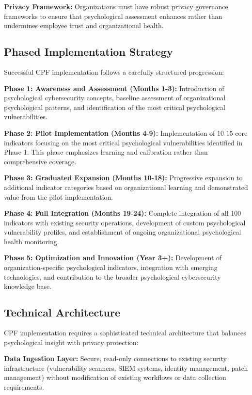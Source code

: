 \documentclass[10pt, twocolumn]{article}
\begin{document}
\textbf{Privacy Framework:} Organizations must have robust privacy governance frameworks to ensure that psychological assessment enhances rather than undermines employee trust and organizational health.

\subsection{Phased Implementation Strategy}

Successful CPF implementation follows a carefully structured progression:

\textbf{Phase 1: Awareness and Assessment (Months 1-3):} Introduction of psychological cybersecurity concepts, baseline assessment of organizational psychological patterns, and identification of the most critical psychological vulnerabilities.

\textbf{Phase 2: Pilot Implementation (Months 4-9):} Implementation of 10-15 core indicators focusing on the most critical psychological vulnerabilities identified in Phase 1. This phase emphasizes learning and calibration rather than comprehensive coverage.

\textbf{Phase 3: Graduated Expansion (Months 10-18):} Progressive expansion to additional indicator categories based on organizational learning and demonstrated value from the pilot implementation.

\textbf{Phase 4: Full Integration (Months 19-24):} Complete integration of all 100 indicators with existing security operations, development of custom psychological vulnerability profiles, and establishment of ongoing organizational psychological health monitoring.

\textbf{Phase 5: Optimization and Innovation (Year 3+):} Development of organization-specific psychological indicators, integration with emerging technologies, and contribution to the broader psychological cybersecurity knowledge base.

\subsection{Technical Architecture}

CPF implementation requires a sophisticated technical architecture that balances psychological insight with privacy protection:

\textbf{Data Ingestion Layer:} Secure, read-only connections to existing security infrastructure (vulnerability scanners, SIEM systems, identity management, patch management) without modification of existing workflows or data collection requirements.
\end{document}
